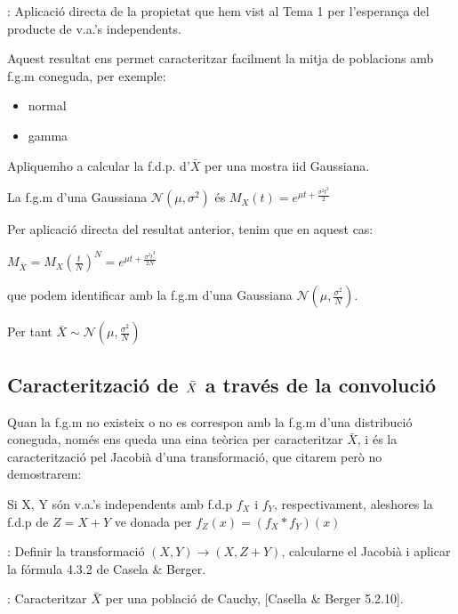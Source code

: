 \documentclass[letterpaper,10pt,english]{sphinxmanual}
\begin{document}
: Aplicació directa de la propietat que hem vist al Tema 1 per l’esperança del producte de v.a.’s independents.

Aquest resultat ens permet caracteritzar facilment la mitja de poblacions
amb f.g.m coneguda, per exemple:
\begin{itemize}
\item {} 
normal

\item {} 
gamma

\end{itemize}

Apliquem\sphinxhyphen{}ho a calcular la f.d.p. d’\(\bar{X}\) per una mostra iid Gaussiana.

La f.g.m d’una Gaussiana \(\mathcal{N}(\mu, \sigma^2)\) és \(M_X(t) = e^{\mu t + \frac{\sigma^2t^2}{2}}\)

Per aplicació directa del resultat anterior, tenim que en aquest cas:

\(M_{\bar{X}} = M_{X}(\frac{t}{N})^N = e^{\mu t + \frac{\sigma^2t^2}{2N}}\)

que podem identificar amb la f.g.m d’una Gaussiana \(\mathcal{N}(\mu, \frac{\sigma^2}{N})\).

Per tant \(\bar{X} \sim \mathcal{N}(\mu, \frac{\sigma^2}{N})\)


\subsection{Caracterització de \protect\(\bar{X}\protect\) a través de la convolució}
\label{\detokenize{0_Intro/0_2_Intro_stats:caracteritzacio-de-bar-x-a-traves-de-la-convolucio}}
Quan la f.g.m no existeix o no es correspon amb la f.g.m d’una distribució coneguda,
només ens queda una eina teòrica per caracteritzar \(\bar{X}\),
i és la caracterització pel Jacobià d’una transformació, que citarem però no demostrarem:

 Si X, Y són v.a.’s independents amb f.d.p \(f_X\) i \(f_Y\), respectivament,
aleshores la f.d.p de \(Z = X + Y\) ve donada per \(f_Z(x) = (f_X \ast f_Y)(x)\)

: Definir la transformació \((X, Y) \to (X, Z + Y)\), calcular\sphinxhyphen{}ne el Jacobià i
aplicar la fórmula 4.3.2 de Casela \& Berger.

: Caracteritzar \(\bar{X}\) per una població de Cauchy, {[}Casella \& Berger 5.2.10{]}.
\end{document}
